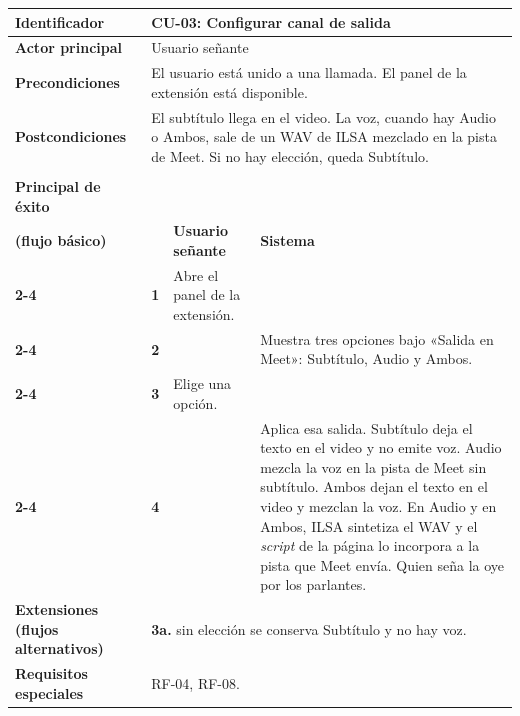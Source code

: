 \begin{table}[h!]
\centering
\renewcommand{\arraystretch}{1.35}
\begin{tabularx}{\textwidth}{|>{\raggedright\arraybackslash\bfseries}p{4cm}|p{0.5cm}|X|X|}
\hline
Identificador & \multicolumn{3}{p{\dimexpr\textwidth-4.5cm-4\tabcolsep\relax}|}{\textbf{CU-03: Configurar canal de salida}} \\ \hline
Actor principal & \multicolumn{3}{p{\dimexpr\textwidth-4.5cm-4\tabcolsep\relax}|}{Usuario señante} \\ \hline
Precondiciones & \multicolumn{3}{p{\dimexpr\textwidth-4.5cm-4\tabcolsep\relax}|}{El usuario está unido a una llamada. El panel de la extensión está disponible.} \\ \hline
Postcondiciones & \multicolumn{3}{p{\dimexpr\textwidth-4.5cm-4\tabcolsep\relax}|}{El subtítulo llega en el video. La voz, cuando hay Audio o Ambos, sale de un WAV de ILSA mezclado en la pista de Meet. Si no hay elección, queda Subtítulo.} \\ \hline
\multirow{3}{4cm}{Escenario\\ Principal de éxito\\ (flujo básico)}
 & & \textbf{Usuario señante} & \textbf{Sistema} \\ \cline{2-4}
 & \textbf{1} & Abre el panel de la extensión. & \\ \cline{2-4}
 & \textbf{2} & & Muestra tres opciones bajo «Salida en Meet»: Subtítulo, Audio y Ambos. \\ \cline{2-4}
 & \textbf{3} & Elige una opción. & \\ \cline{2-4}
 & \textbf{4} &  & Aplica esa salida. Subtítulo deja el texto en el video y no emite voz. Audio mezcla la voz en la pista de Meet sin subtítulo. Ambos dejan el texto en el video y mezclan la voz. En Audio y en Ambos, ILSA sintetiza el WAV y el \textit{script} de la página lo incorpora a la pista que Meet envía. Quien seña la oye por los parlantes. \\ \hline
Extensiones (flujos alternativos) & \multicolumn{3}{p{\dimexpr\textwidth-4.5cm-4\tabcolsep\relax}|}{\textbf{3a.} sin elección se conserva Subtítulo y no hay voz.} \\ \hline
Requisitos especiales & \multicolumn{3}{p{\dimexpr\textwidth-4.5cm-4\tabcolsep\relax}|}{RF-04, RF-08.} \\ \hline
\end{tabularx}
\end{table}

